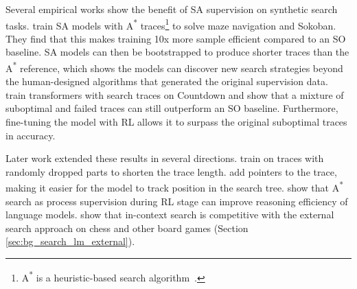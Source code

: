 Several empirical works show the benefit of SA supervision on synthetic search tasks.
\citet{lehnertBetterPlanningTransformers2024} train SA models with A\textsuperscript{*} traces\footnote{A\textsuperscript{*} is a heuristic-based search algorithm~\citep{hartFormalBasisHeuristic1968,russel2010}.} to solve maze navigation and Sokoban.
They find that this makes training 10x more sample efficient compared to an SO baseline.
SA models can then be bootstrapped to produce shorter traces than the A\textsuperscript{*} reference, which shows the models can discover new search strategies beyond the human-designed algorithms that generated the original supervision data.
\citet{gandhiStreamSearchSoS2024} train transformers with search traces on Countdown and show that a mixture of suboptimal and failed traces can still outperform an SO baseline.
Furthermore, fine-tuning the model with RL allows it to surpass the original suboptimal traces in accuracy.

Later work extended these results in several directions.
\citet{suDualformerControllableFast2025} train on traces with randomly dropped parts to shorten the trace length.
\citet{kangLinTreeImprovingLLM2026} add pointers to the trace, making it easier for the model to track position in the search tree.
\citet{opedalLearningReasonEfficiently2026} show that A\textsuperscript{*} search as process supervision during RL stage can improve reasoning efficiency of language models.
\citet{schultzMasteringBoardGames2025} show that in-context search is competitive with the external search approach on chess and other board games (Section \ref{sec:bg_search_lm_external}).

